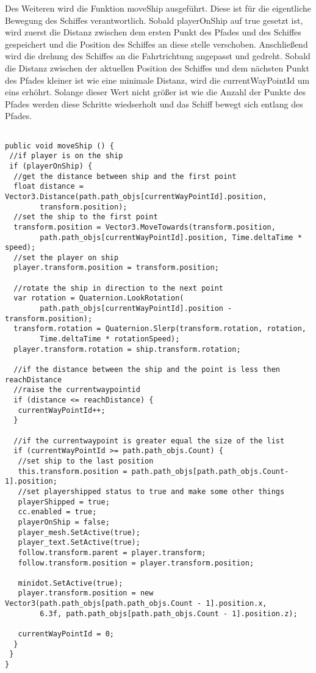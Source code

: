 Des Weiteren wird die Funktion moveShip ausgeführt. Diese ist für die eigentliche Bewegung des Schiffes verantwortlich. Sobald playerOnShip auf true gesetzt ist, wird zuerst die Distanz zwischen dem ersten Punkt des Pfades und des Schiffes gespeichert und die Position des Schiffes an diese stelle verschoben. Anschließend wird die drehung des Schiffes an die Fahrtrichtung angepasst und gedreht. Sobald die Distanz zwischen der aktuellen Position des Schiffes und dem nächsten Punkt des Pfades kleiner ist wie eine minimale Distanz, wird die currentWayPointId um eins erhöhrt. Solange dieser Wert nicht größer ist wie die Anzahl der Punkte des Pfades werden diese Schritte wiedserholt und das Schiff bewegt sich entlang des Pfades.

\begin{scriptsize}
\lstset{
	float,
	caption=Methode moveShip, 
	language=[Sharp]C, 
	frame=single,  
	showstringspaces=false, 
	showspaces=false, 
	numbers=left, 
	captionpos=b, 
	belowcaptionskip=4pt,
	basicstyle=\ttfamily
} 
\begin{lstlisting}[label=lst:methode2]

public void moveShip () {
 //if player is on the ship
 if (playerOnShip) {
  //get the distance between ship and the first point
  float distance = Vector3.Distance(path.path_objs[currentWayPointId].position, 
  		transform.position);
  //set the ship to the first point
  transform.position = Vector3.MoveTowards(transform.position, 
  		path.path_objs[currentWayPointId].position, Time.deltaTime * speed);
  //set the player on ship
  player.transform.position = transform.position;

  //rotate the ship in direction to the next point
  var rotation = Quaternion.LookRotation(
  		path.path_objs[currentWayPointId].position - transform.position);
  transform.rotation = Quaternion.Slerp(transform.rotation, rotation, 
  		Time.deltaTime * rotationSpeed);
  player.transform.rotation = ship.transform.rotation;

  //if the distance between the ship and the point is less then reachDistance 
  //raise the currentwaypointid
  if (distance <= reachDistance) {
   currentWayPointId++;
  }

  //if the currentwaypoint is greater equal the size of the list
  if (currentWayPointId >= path.path_objs.Count) {
   //set ship to the last position
   this.transform.position = path.path_objs[path.path_objs.Count-1].position;
   //set playershipped status to true and make some other things
   playerShipped = true;
   cc.enabled = true;
   playerOnShip = false;
   player_mesh.SetActive(true);
   player_text.SetActive(true);
   follow.transform.parent = player.transform;
   follow.transform.position = player.transform.position;

   minidot.SetActive(true);
   player.transform.position = new Vector3(path.path_objs[path.path_objs.Count - 1].position.x, 
   		6.3f, path.path_objs[path.path_objs.Count - 1].position.z);
                
   currentWayPointId = 0;
  }
 }
}
    
\end{lstlisting}
\end{scriptsize}
